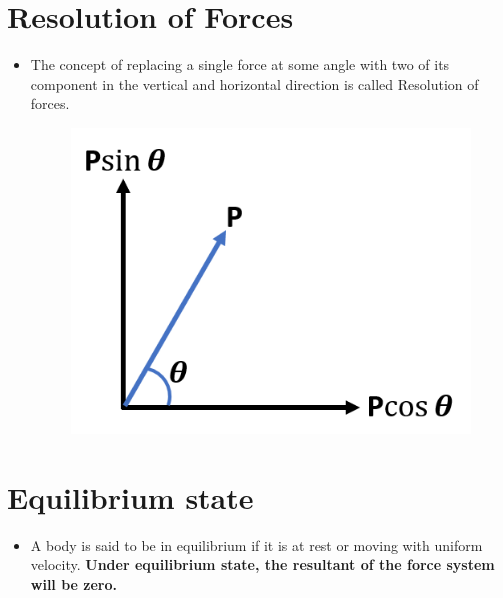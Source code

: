 \documentclass[8pt]{report}
\begin{document}
\section{Resolution of Forces}
	\begin{itemize}
		\item The concept of replacing a single force at some angle with two of its component in the vertical and horizontal direction is called Resolution of forces.
		\begin{figure}[H]
			\centering
			\includegraphics[scale=0.4]{resolution.png}
		\end{figure}
	\end{itemize}\hrulefill		
\section{Equilibrium state}
	\begin{itemize}
		\item A body is said to be in equilibrium if it is at rest or moving with uniform velocity. \textbf{Under equilibrium state, the resultant of the force system will be zero.} 
	\end{itemize}\hrulefill
\end{document}
